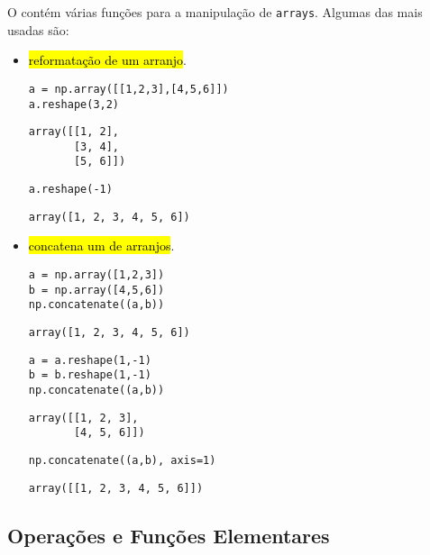 O {\numpy} contém várias funções para a manipulação de \texttt{arrays}. Algumas das mais usadas são:
\begin{itemize}
\item {\PYTHONnumpyDOTreshape} \hl{reformatação de um arranjo}.

\begin{lstlisting}[xrightmargin=2.5em]
a = np.array([[1,2,3],[4,5,6]])
a.reshape(3,2)
\end{lstlisting}

\begin{verbatim}
array([[1, 2],
       [3, 4],
       [5, 6]])
\end{verbatim}

\begin{lstlisting}
a.reshape(-1)
\end{lstlisting}

\begin{verbatim}
array([1, 2, 3, 4, 5, 6])
\end{verbatim}

\item {\PYTHONnumpyDOTconcatenate} \hl{concatena um {\PYTHONtuple} de arranjos}.

\begin{lstlisting}[xrightmargin=2.5em]
a = np.array([1,2,3])
b = np.array([4,5,6])
np.concatenate((a,b))
\end{lstlisting}

\begin{verbatim}
array([1, 2, 3, 4, 5, 6])
\end{verbatim}

\begin{lstlisting}
a = a.reshape(1,-1)
b = b.reshape(1,-1)
np.concatenate((a,b))
\end{lstlisting}

\begin{verbatim}
array([[1, 2, 3],
       [4, 5, 6]])
\end{verbatim}

\begin{lstlisting}
np.concatenate((a,b), axis=1)
\end{lstlisting}

\begin{verbatim}
array([[1, 2, 3, 4, 5, 6]])
\end{verbatim}

\end{itemize}

\subsection{Operações e Funções Elementares}

